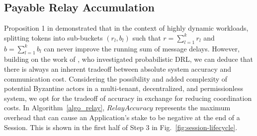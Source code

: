 \documentclass[runningheads]{llncs}
\begin{document}
	





\subsection{Payable Relay Accumulation}

Proposition 1 in \cite{wustl2021drl} demonstrated that in the context of highly dynamic workloads, splitting tokens into sub-buckets $(r_l, b_l)$ such that $r=\sum\limits_{l=1}^{k}r_l$ and $b=\sum\limits_{l=1}^{k}b_l$ can never improve the running sum of message delays. However, building on the work of \cite{calu2007drl}, who investigated probabilistic DRL, we can deduce that there is always an inherent tradeoff between absolute system accuracy and communication cost. Considering the possibility and added complexity of potential Byzantine actors in a multi-tenant, decentralized, and permissionless system, we opt for the tradeoff of accuracy in exchange for reducing coordination costs. In Algorithm~\ref{algo_relay}, $RelayAccuracy$ represents the maximum overhead that can cause an Application's stake to be negative at the end of a Session. This is shown in the first half of Step 3 in Fig.~\ref{fig:session-lifecycle}.
\end{document}
